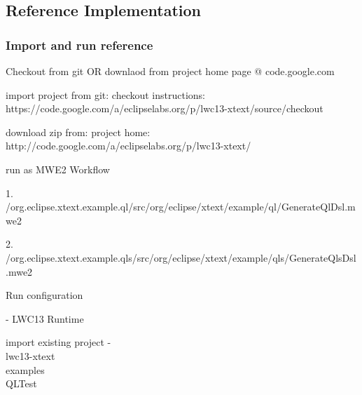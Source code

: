 \subsection{Reference Implementation}
\label{subsec:referenceImpl}





\subsubsection{Import and run reference}

Checkout from git OR downlaod from project home page @ code.google.com

import project from git:
checkout instructions:
https://code.google.com/a/eclipselabs.org/p/lwc13-xtext/source/checkout

download zip from:
project home: http://code.google.com/a/eclipselabs.org/p/lwc13-xtext/

run as MWE2 Workflow

1. /org.eclipse.xtext.example.ql/src/org/eclipse/xtext/example/ql/GenerateQlDsl.mwe2

2. /org.eclipse.xtext.example.qls/src/org/eclipse/xtext/example/qls/GenerateQlsDsl.mwe2

Run configuration

- LWC13 Runtime

import existing project
- \\lwc13-xtext\\examples\\QLTest



